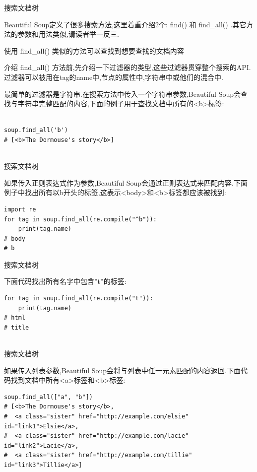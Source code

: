 \documentclass{beamer}
\begin{document}
\begin{frame}[t,fragile]{搜索文档树}

Beautiful Soup定义了很多搜索方法,这里着重介绍2个: find() 和 find\_all() .其它方法的参数和用法类似,请读者举一反三.

使用 find\_all() 类似的方法可以查找到想要查找的文档内容

介绍 find\_all() 方法前,先介绍一下过滤器的类型,这些过滤器贯穿整个搜索的API.过滤器可以被用在tag的name中,节点的属性中,字符串中或他们的混合中.

最简单的过滤器是字符串.在搜索方法中传入一个字符串参数,Beautiful Soup会查找与字符串完整匹配的内容,下面的例子用于查找文档中所有的<b>标签:

\begin{verbatim}

soup.find_all('b')
# [<b>The Dormouse's story</b>]


\end{verbatim}


\end{frame}

\begin{frame}[t,fragile]{搜索文档树}

如果传入正则表达式作为参数,Beautiful Soup会通过正则表达式来匹配内容.下面例子中找出所有以b开头的标签,这表示<body>和<b>标签都应该被找到:

\begin{verbatim}
import re
for tag in soup.find_all(re.compile("^b")):
    print(tag.name)
# body
# b
\end{verbatim}


\end{frame}



\begin{frame}[t,fragile]{搜索文档树}

下面代码找出所有名字中包含”t”的标签:
\begin{verbatim}
for tag in soup.find_all(re.compile("t")):
    print(tag.name)
# html
# title


\end{verbatim}


\end{frame}


\begin{frame}[t,fragile]{搜索文档树}

如果传入列表参数,Beautiful Soup会将与列表中任一元素匹配的内容返回.下面代码找到文档中所有<a>标签和<b>标签:

\begin{verbatim}
soup.find_all(["a", "b"])
# [<b>The Dormouse's story</b>,
#  <a class="sister" href="http://example.com/elsie" id="link1">Elsie</a>,
#  <a class="sister" href="http://example.com/lacie" id="link2">Lacie</a>,
#  <a class="sister" href="http://example.com/tillie" id="link3">Tillie</a>]


\end{verbatim}


\end{frame}
\end{document}
